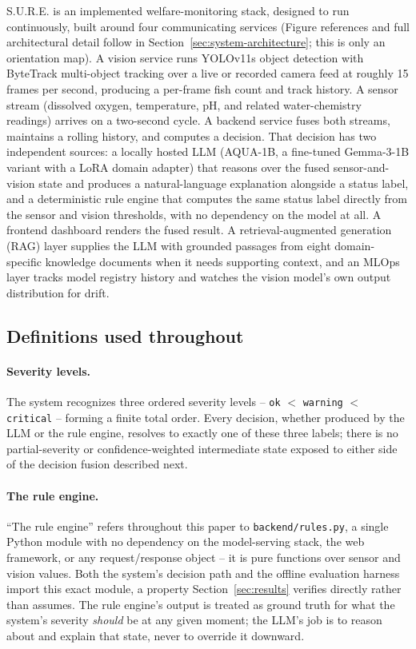 S.U.R.E. is an implemented welfare-monitoring stack, designed to run continuously, built around four
communicating services (Figure references and full architectural detail follow in
Section~\ref{sec:system-architecture}; this is only an orientation map). A vision service runs
YOLOv11s object detection with ByteTrack \citep{zhang2022bytetrack} multi-object tracking over a
live or recorded camera feed at roughly 15 frames per second, producing a per-frame fish count and
track history. A sensor stream (dissolved oxygen, temperature, pH, and related water-chemistry
readings) arrives on a two-second cycle. A backend service fuses both streams, maintains a rolling
history, and computes a decision. That decision has two independent sources: a locally hosted LLM
(AQUA-1B, a fine-tuned Gemma-3-1B variant with a LoRA domain adapter) that reasons over the fused
sensor-and-vision state and produces a natural-language explanation alongside a status label, and a
deterministic rule engine that computes the same status label directly from the sensor and vision
thresholds, with no dependency on the model at all. A frontend dashboard renders the fused result.
A retrieval-augmented generation (RAG) layer supplies the LLM with grounded passages from eight
domain-specific knowledge documents when it needs supporting context, and an MLOps layer tracks
model registry history and watches the vision model's own output distribution for drift.

\subsection{Definitions used throughout}

\paragraph{Severity levels.} The system recognizes three ordered severity levels --
\texttt{ok} $<$ \texttt{warning} $<$ \texttt{critical} -- forming a finite total order. Every
decision, whether produced by the LLM or the rule engine, resolves to exactly one of these three
labels; there is no partial-severity or confidence-weighted intermediate state exposed to either
side of the decision fusion described next.

\paragraph{The rule engine.} ``The rule engine'' refers throughout this paper to
\texttt{backend/rules.py}, a single Python module with no dependency on the model-serving stack,
the web framework, or any request/response object -- it is pure functions over sensor and vision
values. Both the system's decision path and the offline evaluation harness import this exact
module, a property Section~\ref{sec:results} verifies directly rather than assumes. The rule
engine's output is treated as ground truth for what the system's severity \emph{should} be at any
given moment; the LLM's job is to reason about and explain that state, never to override it
downward.

